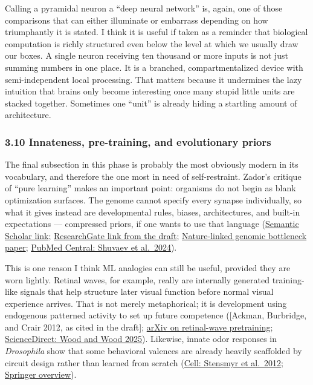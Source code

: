 Calling a pyramidal neuron a ``deep neural network'' is, again, one of those comparisons that can either illuminate or embarrass depending on how triumphantly it is stated. I think it is useful if taken as a reminder that biological computation is richly structured even below the level at which we usually draw our boxes. A single neuron receiving ten thousand or more inputs is not just summing numbers in one place. It is a branched, compartmentalized device with semi-independent local processing. That matters because it undermines the lazy intuition that brains only become interesting once many stupid little units are stacked together. Sometimes one ``unit'' is already hiding a startling amount of architecture.

\subsubsection{3.10 Innateness, pre-training, and evolutionary priors}\label{03_it_started-innateness-pre-training-and-evolutionary-priors}

The final subsection in this phase is probably the most obviously modern in its vocabulary, and therefore the one most in need of self-restraint. Zador's critique of ``pure learning'' makes an important point: organisms do not begin as blank optimization surfaces. The genome cannot specify every synapse individually, so what it gives instead are developmental rules, biases, architectures, and built-in expectations --- compressed priors, if one wants to use that language (\href{https://www.semanticscholar.org/paper/A-critique-of-pure-learning-and-what-artificial-can-Zador/32abbcb3aa75ac34a92624dc779a9f7a82ee981c}{Semantic Scholar link}; \href{https://www.researchgate.net/publication/335310161_A_critique_of_pure_learning_and_what_artificial_neural_networks_can_le}{ResearchGate link from the draft}; \href{https://www.nature.com/articles/s41467-019-11786-6}{Nature-linked genomic bottleneck paper}; \href{https://pmc.ncbi.nlm.nih.gov/articles/PMC11420173/}{PubMed Central: Shuvaev et al.~2024}).

This is one reason I think ML analogies can still be useful, provided they are worn lightly. Retinal waves, for example, really are internally generated training-like signals that help structure later visual function before normal visual experience arrives. That is not merely metaphorical; it is development using endogenous patterned activity to set up future competence ({[}Ackman, Burbridge, and Crair 2012, as cited in the draft{]}; \href{https://arxiv.org/abs/2311.17232}{arXiv on retinal-wave pretraining}; \href{https://www.sciencedirect.com/science/article/abs/pii/S0010027725003567?dgcid=rss_sd_all}{ScienceDirect: Wood and Wood 2025}). Likewise, innate odor responses in \emph{Drosophila} show that some behavioral valences are already heavily scaffolded by circuit design rather than learned from scratch (\href{https://www.cell.com/fulltext/S0092-8674(12)01357-8}{Cell: Stensmyr et al.~2012}; \href{https://link.springer.com/article/10.1007/s00441-020-03392-6}{Springer overview}).

